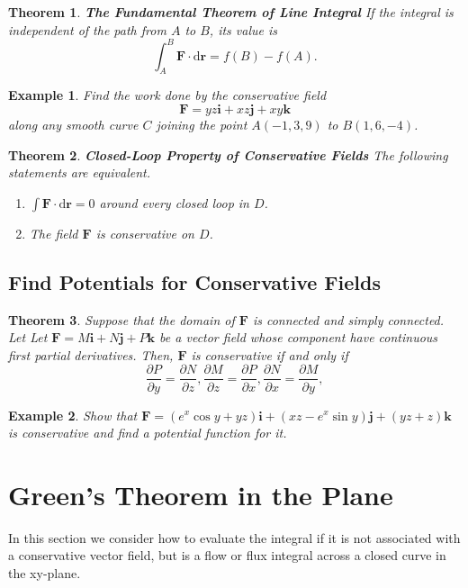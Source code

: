 \documentclass[a4paper,12pt]{article}
\newtheorem{example}{Example}             %
\newtheorem{theorem}{Theorem}[section]  %
\begin{document}
\begin{CJK}{UTF8}{gbsn}
\begin{theorem}{\rm \textbf{The Fundamental Theorem of Line Integral}}
    If the integral is independent of the path from
    $A$ to $B$, its value is 
    \[
        \int_A^B\bm{F} \cdot \mathrm{d}\bm{r} = f(B) - f(A).
    \]
\end{theorem}
\begin{example}
    Find the work done by the conservative field 
    \[
        \bm{F} = yz\bm{i} + xz\bm{j} + xy\bm{k}
    \]
along any smooth curve $C$ joining the point $A(-1,3,9)$ to $B(1,6,-4)$.
\end{example}

\begin{theorem}{\rm \textbf{Closed-Loop Property of Conservative Fields}}
    The following statements are equivalent.
    \begin{enumerate}
        \item $\int \bm{F} \cdot \mathrm{d}\bm{r} = 0$ around every closed loop in $D$.
        \item The field $\bm{F}$ is conservative on $D$.
    \end{enumerate}
\end{theorem}

\subsection{Find Potentials for Conservative Fields}
\begin{theorem}
    Suppose that the domain of $\bm{F}$ is connected and simply connected.
    Let Let $\bm{F} = M\bm{i} + N\bm{j} + P\bm{k}$ be a vector 
    field whose component have continuous first partial derivatives. Then,
    $\bm{F}$ is conservative if and only if 
    \[
        \frac{\partial P}{\partial y} = \frac{\partial N}{\partial z}, 
        \frac{\partial M}{\partial z} = \frac{\partial P}{\partial x}, 
        \frac{\partial N}{\partial x} = \frac{\partial M}{\partial y}, 
        \]
\end{theorem}

\begin{example}
    Show that $\bm{F} = (e^x\cos y + yz)\bm{i} + (xz - e^x\sin y)\bm{j} 
    + (yz + z)\bm{k}$ is conservative and find a potential function for it.
\end{example}

\section{Green's Theorem in the Plane}
In this section we consider how to evaluate the integral if it is not 
associated with a conservative vector field, but is a flow or flux 
integral across a closed curve in the xy-plane.


\end{CJK}
\end{document}
